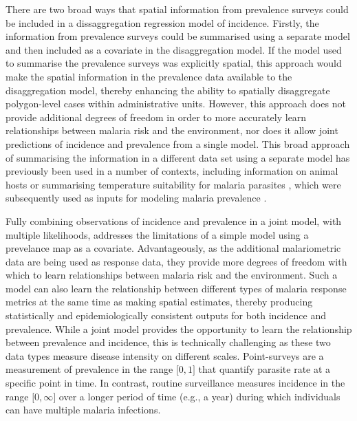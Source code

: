 \documentclass{statsoc}
\begin{document}
There are two broad ways that spatial information from prevalence surveys could be included in a dissaggregation regression model of incidence.
Firstly, the information from prevalence surveys could be summarised using a separate model and then included as a covariate in the disaggregation model.
If the model used to summarise the prevalence surveys was explicitly spatial, this approach would make the spatial information in the prevalence data available to the disaggregation model, thereby enhancing the ability to spatially disaggregate polygon-level cases within administrative units.
However, this approach does not provide additional degrees of freedom in order to more accurately learn relationships between malaria risk and the environment, nor does it allow joint predictions of incidence and prevalence from a single model.
This broad approach of summarising the information in a different data set using a separate model has previously been used in a number of contexts, including information on animal hosts \citep{shearer2016estimating} or summarising temperature suitability for malaria parasites \citep{weiss2014air}, which were subsequently used as inputs for modeling malaria prevalence \citep{bhatt2015effect, weiss2019mapping}.

Fully combining observations of incidence and prevalence in a joint model, with multiple likelihoods, addresses the limitations of a simple model using a prevelance map as a covariate.
Advantageously, as the additional malariometric data are being used as response data, they provide more degrees of freedom with which to learn relationships between malaria risk and the environment.
Such a model can also learn the relationship between different types of malaria response metrics at the same time as making spatial estimates, thereby producing statistically and epidemiologically consistent outputs for both incidence and prevalence.
While a joint model provides the opportunity to learn the relationship between prevalence and incidence, this is technically challenging as these two data types measure disease intensity on different scales.
Point-surveys are a measurement of prevalence in the range $\lbrack 0, 1\rbrack$ that quantify parasite rate at a specific point in time.
In contrast, routine surveillance measures incidence in the range $\lbrack 0, \infty\rbrack$ over a longer period of time (e.g., a year) during which individuals can have multiple malaria infections.
\end{document}
